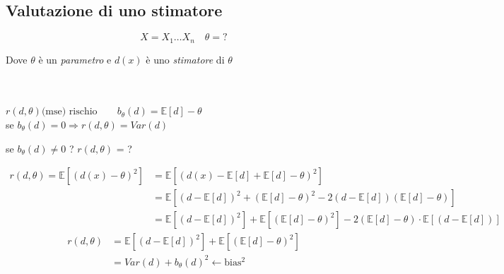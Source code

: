 \documentclass[]{article}
\newcommand{\ev}{\mathbb{E}[X]}
\renewcommand{\ev}[1]{\mathbb{E}\left[#1\right]}
\begin{document}
    \subsection{Valutazione di uno stimatore}
    \[ X = X_1 \ldots X_n \quad \theta = ? \]
    \centerline{Dove $\theta$ è un \textit{parametro} e $d(x)$ è uno \textit{stimatore} di $\theta$} \\ \\
    $r(d, \theta) \text{(mse) rischio} \quad \quad b_\theta(d) = \ev{d} - \theta$ \\
    se $b_\theta(d) = 0 \Rightarrow r(d, \theta) = Var(d)$ \\
    \centerline{se $b_\theta(d) \not = 0$ ? $r(d, \theta)$ = ?}
    \begin{equation*}
        \begin{split}
            r(d, \theta) = \ev{(d(x) - \theta)^2} &= \ev{(d(x) - \ev{d} + \ev{d} - \theta)^2} \\
            &= \ev{(d - \ev{d})^2 + (\ev{d} - \theta)^2 - 2(d - \ev{d}) (\ev{d} - \theta)} \\
            &= \ev{(d - \ev{d})^2} + \ev{(\ev{d} - \theta)^2} - 2(\ev{d} - \theta) \cdot \ev{(d- \ev{d})}
        \end{split}
    \end{equation*}
    \begin{equation*}
        \begin{split}
           r(d, \theta) &= \ev{(d - \ev{d})^2} + \ev{(\ev{d} - \theta)^2} \\
           &= Var(d) + b_\theta(d)^2 \leftarrow \text{bias$^2$}
        \end{split}
    \end{equation*}
\end{document}

